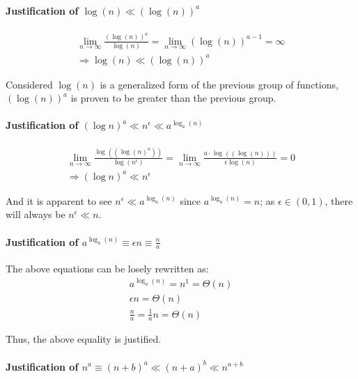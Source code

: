 \documentclass[12pt]{article}
\begin{document}
\paragraph{Justification of $ \log(n)\ll  (\log (n))^a $\newline}
\begin{gather}
    \lim\limits_{n \to \infty} \frac{(\log (n))^a}{\log (n)} = \lim\limits_{n \to \infty} (\log(n))^{a-1} = \infty \nonumber \\
    \Rightarrow  \log(n)\ll  (\log (n))^a
\end{gather}

Considered $ \log(n)$ is a generalized form of the previous group of functions,  $(\log (n))^a$ is proven to be greater than the previous group.


\paragraph{Justification of $  (\log n)^a \ll n^{\epsilon} \ll a^{\log_a(n)}$\newline}

\begin{gather}
    \lim\limits_{n \to \infty} \frac{\log((\log(n)^a))}{\log(n^\epsilon)} = \lim\limits_{n \to \infty} \frac{a \cdot \log((\log(n)))}{\epsilon \log(n)} = 0 \nonumber \\
    \Rightarrow (\log n)^a \ll n^{\epsilon}
\end{gather}

And it is apparent to see $n^{\epsilon} \ll  a^{\log_a(n)}$ since $ a^{\log_a(n)} = n$; as $\epsilon \in (0, 1)$, there will always be $n^{\epsilon} \ll n$.

\paragraph{Justification of $a^{\log_a(n)} \equiv \epsilon n \equiv \frac{n}{a}$\newline}

The above equations can be losely rewritten as:
\begin{gather}
    a^{\log_a(n)} = n^1 = \Theta(n) \\
    \epsilon n = \Theta(n) \\
    \frac{n}{a} = \frac{1}{a}n =  \Theta(n)
\end{gather}

Thus, the above equality is justified.


\paragraph{Justification of $n^a \equiv (n+b)^a \ll (n+a)^b \ll n^{a+b}$\newline}
\end{document}
